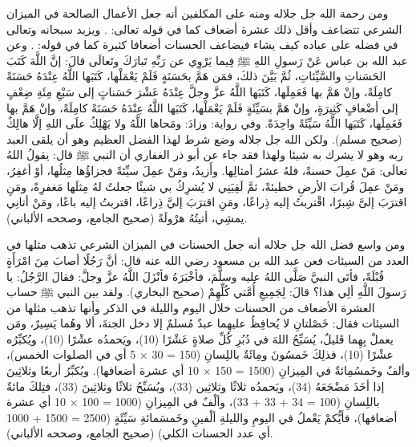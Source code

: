 ومن رحمة الله جل جلاله ومنه على المكلفين أنه جعل الأعمال الصالحة في الميزان الشرعي تتضاعف وأقل ذلك عشرة أضعاف كما في قوله تعالى: 
\quranayah*[6][160]{\footnotesize \surahname*[6]}. ويزيد سبحانه وتعالى في فضله على عباده كيف يشاء فيضاعف الحسنات أضعافا كثيرة كما في قوله: 
\quranayah*[2][245]{\footnotesize \surahname*[2]}.
وعن عبد الله بن عباس عَنْ رَسولِ اللهِ ﷺ فِيما يَرْوِي عن رَبِّهِ تَبارَكَ وتَعالَى قالَ: إنَّ اللَّهَ كَتَبَ الحَسَناتِ والسَّيِّئاتِ، ثُمَّ بَيَّنَ ذلكَ، فمَن هَمَّ بحَسَنَةٍ فَلَمْ يَعْمَلْها، كَتَبَها اللَّهُ عِنْدَهُ حَسَنَةً كامِلَةً، وإنْ هَمَّ بها فَعَمِلَها، كَتَبَها اللَّهُ عزَّ وجلَّ عِنْدَهُ عَشْرَ حَسَناتٍ إلى سَبْعِ مِئَةِ ضِعْفٍ إلى أضْعافٍ كَثِيرَةٍ، وإنْ هَمَّ بسَيِّئَةٍ فَلَمْ يَعْمَلْها، كَتَبَها اللَّهُ عِنْدَهُ حَسَنَةً كامِلَةً، وإنْ هَمَّ بها فَعَمِلَها، كَتَبَها اللَّهُ سَيِّئَةً واحِدَةً. وفي رواية: وزادَ: ومَحاها اللَّهُ ولا يَهْلِكُ علَى اللهِ إلَّا هالِكٌ {\footnotesize (صحيح مسلم)}. ولكن الله جل جلاله وضع شرط لهذا الفضل العظيم وهو أن يلقى العبد ربه وهو لا يشرك به شيئا ولهذا فقد جاء عن أبو ذر الغفاري أن النبي ﷺ قال: يقولُ اللهُ تعالَى: مَنْ عمِلَ حسنةً، فلهُ عشرُ أمثالِها. وأَزيدُ، ومَنْ عمِلَ سيِّئةً فجزاؤُها مِثلُها، أوْ أغفِرُ، ومَنْ عمِلَ قُرابَ الأرضِ خطيئةً، ثمَّ لَقِيَنِي لا يُشرِكُ بي شيئًا جعلتُ لهُ مِثلَها مَغفرِةً، ومَنِ اقترَبَ إلىَّ شِبرًا، اقْتربتُ إليه ذِراعًا، ومَنِ اقترَبَ إليَّ ذِراعًا، اقتربتُ إليه باعًا، ومَنْ أتانِي يمشِي، أتيتُهُ هرْولَةً {\footnotesize (صحيح الجامع، وصححه الألباني)}.

ومن واسع فضل الله جل جلاله أنه جعل الحسنات في الميزان الشرعي تذهب مثلها في العدد من السيئات فعن عبد الله بن مسعود رضي الله عنه قال: أنَّ رَجُلًا أصابَ مِنَ امْرَأَةٍ قُبْلَةً، فأتَى النبيَّ صَلَّى اللهُ عليه وسلَّمَ، فأخْبَرَهُ فأنْزَلَ اللَّهُ عزَّ وجلَّ: \quranayah*[11][114]{\footnotesize \surahname*[11]} فقالَ الرَّجُلُ: يا رَسولَ اللَّهِ ألِي هذا؟ قالَ: لِجَمِيعِ أُمَّتي كُلِّهِمْ {\footnotesize (صحيح البخاري)}. ولقد بين النبي ﷺ حساب العشرة الأضعاف من الحسنات خلال اليوم والليلة في الذكر وأنها تذهب مثلها من السيئات فقال: خَصْلتانِ لا يُحافِظُ عليهِما عبدٌ مُسلمٌ إلا دخل الجنةَ، ألا وهُما يَسِيرٌ، ومَن يعملْ بِهِما قَليلٌ، يُسَبِّحُ اللهَ في دُبُرِ كُلِّ صلاةٍ عَشْرًا (10)، ويَحمدُه عشْرًا (10)، ويُكبِّرُه عشْرًا (10)، فذلِكَ خَمسُونَ ومِائَةٌ باللِسانِ (150 = 30 × 5 أي في الصلوات الخمس)، وألفٌ وخَمسُمِائةٌ في المِيزانِ (1500 = 150 × 10 أي عشرة أضعافها). ويُكبِّرُ أربعًا وثلاثِينَ إذا أخَذَ مَضْجَعَهُ (34)، ويَحمدُه ثلاثًا وثلاثِين (33)، ويُسَبِّحُ ثلاثًا وثلاثِينَ (33)، فتِلكَ مائةٌ باللِسانِ (100 = 34 + 33 + 33)، وألْفٌ في المِيزانِ (1000 = 100 × 10 أي عشرة أضعافها)، فأيُّكمْ يَعْملُ في اليومِ والليلةِ ألْفينِ وخَمسَمائةِ سَيِّئَةٍ (2500 = 1500 + 1000 أي عدد الحسنات الكلي) {\footnotesize (صحيح الجامع، وصححه الألباني)}. 

